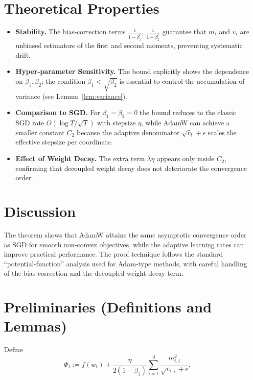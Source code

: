 \documentclass{article}
\begin{document}
\section*{Theoretical Properties}
\begin{itemize}
\item \textbf{Stability.} The bias‑correction terms $\frac{1}{1-\beta_1^{t}}$, $\frac{1}{1-\beta_2^{t}}$ guarantee that $m_t$ and $v_t$ are unbiased estimators of the first and second moments, preventing systematic drift.
\item \textbf{Hyper‑parameter Sensitivity.} The bound explicitly shows the dependence on $\beta_1,\beta_2$; the condition $\beta_1<\sqrt{\beta_2}$ is essential to control the accumulation of variance (see Lemma~\ref{lem:variance}).
\item \textbf{Comparison to SGD.} For $\beta_1=\beta_2=0$ the bound reduces to the classic SGD rate $O(\log T/\sqrt{T})$ with stepsize $\eta$, while AdamW can achieve a smaller constant $C_2$ because the adaptive denominator $\sqrt{\hat v_t}+\epsilon$ scales the effective stepsize per coordinate.
\item \textbf{Effect of Weight Decay.} The extra term $ \lambda\eta $ appears only inside $C_2$, confirming that decoupled weight decay does not deteriorate the convergence order.
\end{itemize}

\section*{Discussion}
The theorem shows that AdamW attains the same asymptotic convergence order as SGD for smooth non‑convex objectives, while the adaptive learning rates can improve practical performance. The proof technique follows the standard “potential‑function” analysis used for Adam‑type methods, with careful handling of the bias‑correction and the decoupled weight‑decay term.

\section*{Preliminaries (Definitions and Lemmas)}
\begin{definition}
Define
\[
\Phi_t := f(w_{t}) + \frac{\eta}{2(1-\beta_1)}\sum_{i=1}^{d}\frac{m_{t,i}^{2}}{\sqrt{v_{t,i}}+\epsilon}.
\]
\end{definition}
\end{document}
